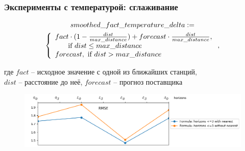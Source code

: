 \documentclass{beamer}
\begin{document}
\begin{frame}\frametitle{\large Эксперименты с температурой: сглаживание}
\setlength\parindent{24pt}

\begingroup
\setlength\abovedisplayskip{0pt}

\begin{multline*}
smoothed\_fact\_temperature\_delta := \\\left\{
    \begin{array}{ll}
      fact \cdot (1 - \frac{dist}{max\_distance}) + forecast \cdot \frac{dist}{max\_distance},
      \\\indent \text{     if }dist \le max\_distance  \\
      forecast, \text{ if } dist > max\_distance
    \end{array}
  \right.,
\end{multline*}
\endgroup

{\scriptsize 
    \indent где $fact$ -- исходное значение с одной из ближайших станций, \\
    \indent $dist$ -- расстояние до неё, $forecast$ -- прогноз поставщика
}

\begin{figure}
\centering
\includegraphics[width=\linewidth]{images/pic3_metrics_final.png}
\end{figure}

\end{frame}




\end{document}
